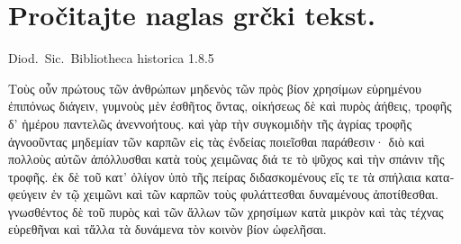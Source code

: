 
\section*{Pročitajte naglas grčki tekst.}

Diod.\ Sic.\ Bibliotheca historica 1.8.5


\medskip

\begin{greek}
{\large
{ \noindent Τοὺς οὖν πρώτους τῶν ἀνθρώπων μηδενὸς τῶν πρὸς βίον χρησίμων εὑρημένου ἐπιπόνως διάγειν, γυμνοὺς μὲν ἐσθῆτος ὄντας, οἰκήσεως δὲ καὶ πυρὸς ἀήθεις, τροφῆς δ' ἡμέρου παντελῶς ἀνεννοήτους. καὶ γὰρ τὴν συγκομιδὴν τῆς ἀγρίας τροφῆς ἀγνοοῦντας μηδεμίαν τῶν καρπῶν εἰς τὰς ἐνδείας ποιεῖσθαι παράθεσιν· διὸ καὶ πολλοὺς αὐτῶν ἀπόλλυσθαι κατὰ τοὺς χειμῶνας διά τε τὸ ψῦχος καὶ τὴν σπάνιν τῆς τροφῆς. ἐκ δὲ τοῦ κατ' ὀλίγον ὑπὸ τῆς πείρας διδασκομένους εἴς τε τὰ σπήλαια καταφεύγειν ἐν τῷ χειμῶνι καὶ τῶν καρπῶν τοὺς φυλάττεσθαι δυναμένους ἀποτίθεσθαι. γνωσθέντος δὲ τοῦ πυρὸς καὶ τῶν ἄλλων τῶν χρησίμων κατὰ μικρὸν καὶ τὰς τέχνας εὑρεθῆναι καὶ τἄλλα τὰ δυνάμενα τὸν κοινὸν βίον ὠφελῆσαι.

}
}
\end{greek}


